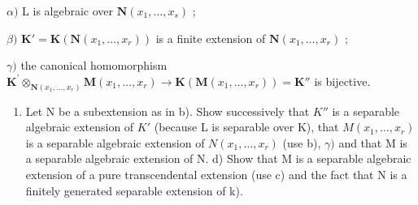 \(\alpha)\) L is algebraic over \(\mathbf{N}(x_1,\dots,x_s)\) ;

\(\beta)\) \(\mathbf{K}' = \mathbf{K}(\mathbf{N}(x_1,\dots,x_r))\) is a finite extension of \(\mathbf{N}(x_1,\dots,x_r)\) ;

\(\gamma)\) the canonical homomorphism \(\mathbf{K}^{\prime}\otimes_{\mathbf{N}(x_1,\ldots ,x_r)}\mathbf{M}(x_1,\dots,x_r)\to \mathbf{K}(\mathbf{M}(x_1,\dots,x_r)) = \mathbf{K}''\) is bijective.

\begin{enumerate}
\def\labelenumi{\alph{enumi})}
\setcounter{enumi}{2}
\tightlist
\item
  Let N be a subextension as in b). Show successively that \(K''\) is a separable algebraic extension of \(K'\) (because L is separable over K), that \(M(x_{1}, \ldots, x_{r})\) is a separable algebraic extension of \(N(x_{1}, \ldots, x_{r})\) (use b), \(\gamma)\) and that M is a separable algebraic extension of N. d) Show that M is a separable algebraic extension of a pure transcendental extension (use c) and the fact that N is a finitely generated separable extension of k).
\end{enumerate}

